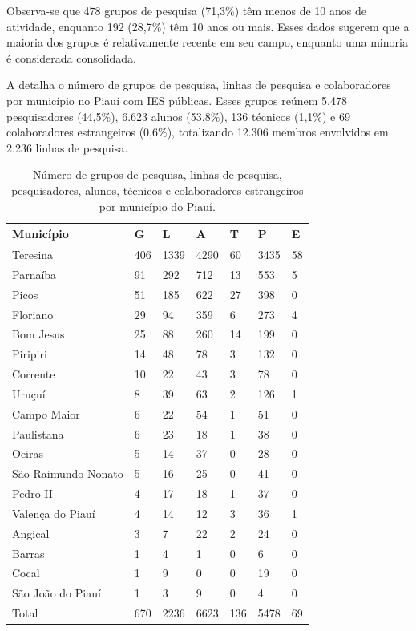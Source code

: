 \documentclass[portuguese]{textolivre}
\begin{document}
Observa-se que 478 grupos de pesquisa (71,3\%) têm menos de 10 anos de atividade, enquanto 192 (28,7\%) têm 10 anos ou mais. Esses dados sugerem que a maioria dos grupos é relativamente recente em seu campo, enquanto uma minoria é considerada consolidada.

A  detalha o número de grupos de pesquisa, linhas de pesquisa e colaboradores por município no Piauí com IES públicas. Esses grupos reúnem 5.478 pesquisadores (44,5\%), 6.623 alunos (53,8\%), 136 técnicos (1,1\%) e 69 colaboradores estrangeiros (0,6\%), totalizando 12.306 membros envolvidos em 2.236 linhas de pesquisa.

\begin{table}[htbp]
\centering
\begin{threeparttable}
\caption{Número de grupos de pesquisa, linhas de pesquisa, pesquisadores, alunos, técnicos e colaboradores estrangeiros por município do Piauí.}
\label{tbl1}
\begin{tabular}{lllllll}
\toprule
Município & G & L & A & T & P & E \\ 
\midrule
Teresina & 406 & 1339 & 4290 & 60 & 3435 & 58 \\
Parnaíba & 91 & 292 & 712 & 13 & 553 & 5 \\
Picos & 51 & 185 & 622 & 27 & 398 & 0 \\
Floriano & 29 & 94 & 359 & 6 & 273 & 4 \\
Bom Jesus & 25 & 88 & 260 & 14 & 199 & 0 \\
Piripiri & 14 & 48 & 78 & 3 & 132 & 0 \\
Corrente & 10 & 22 & 43 & 3 & 78 & 0 \\
Uruçuí & 8 & 39 & 63 & 2 & 126 & 1 \\
Campo Maior & 6 & 22 & 54 & 1 & 51 & 0 \\
Paulistana & 6 & 23 & 18 & 1 & 38 & 0 \\
Oeiras & 5 & 14 & 37 & 0 & 28 & 0 \\
São Raimundo Nonato & 5 & 16 & 25 & 0 & 41 & 0 \\
Pedro II & 4 & 17 & 18 & 1 & 37 & 0 \\
Valença do Piauí & 4 & 14 & 12 & 3 & 36 & 1 \\
Angical & 3 & 7 & 22 & 2 & 24 & 0 \\
Barras & 1 & 4 & 1 & 0 & 6 & 0 \\
Cocal & 1 & 9 & 0 & 0 & 19 & 0 \\
São João do Piauí & 1 & 3 & 9 & 0 & 4 & 0 \\
\midrule
Total & 670 & 2236 & 6623 & 136 & 5478 & 69 \\

\end{tabular}
\end{threeparttable}
\end{table}
\end{document}
